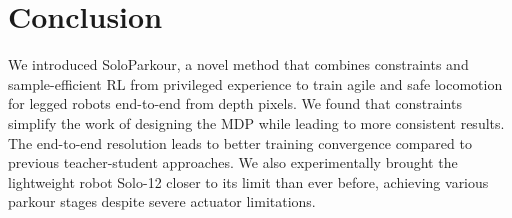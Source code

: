 \section{Conclusion}

We introduced SoloParkour, a novel method that combines constraints and sample-efficient RL from privileged experience to train agile and safe locomotion for legged robots end-to-end from depth pixels.
We found that constraints simplify the work of designing the MDP while leading to more consistent results.
The end-to-end resolution leads to better training convergence compared to previous teacher-student approaches.%
We also experimentally brought the lightweight robot Solo-12 closer to its limit than ever before, achieving various parkour stages despite severe actuator limitations.
